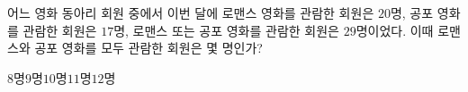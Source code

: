 어느 영화 동아리 회원 중에서 이번 달에 로맨스 영화를 관람한 회원은 $20$명, 공포 영화를 관람한 회원은 $17$명, 로맨스 또는 공포 영화를 관람한 회원은 $29$명이었다. 이때 로맨스와 공포 영화를 모두 관람한 회원은 몇 명인가?
\begin{choices32}{$8$명}{$9$명}{$10$명}{$11$명}{$12$명}\end{choices32}
